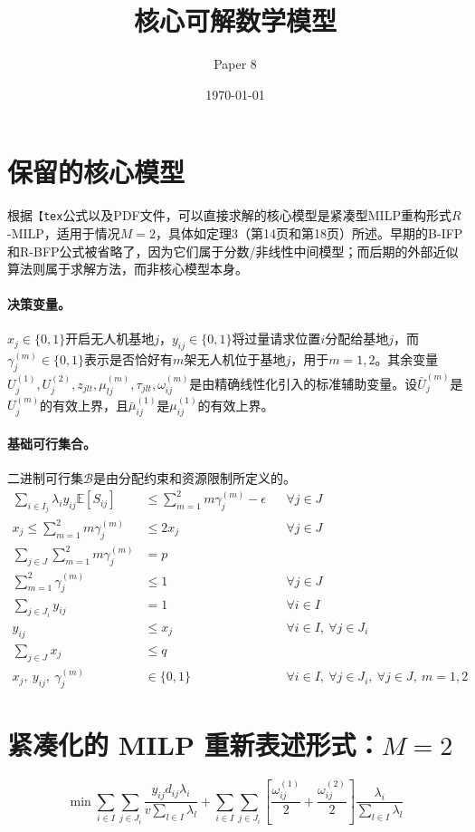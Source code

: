 \documentclass{article}
\title{核心可解数学模型}
\author{Paper 8}
\date{\today}
\begin{document}
\maketitle

\section*{保留的核心模型}
根据\texttt{【tex}公式以及PDF文件，可以直接求解的核心模型是紧凑型MILP重构形式$R$-MILP，适用于情况$M=2$，具体如定理3（第14页和第18页）所述。早期的B-IFP和R-BFP公式被省略了，因为它们属于分数/非线性中间模型；而后期的外部近似算法则属于求解方法，而非核心模型本身。

\paragraph{决策变量。}
$x_j \in \{0,1\}$开启无人机基地$j$，$y_{ij}\in\{0,1\}$将过量请求位置$i$分配给基地$j$，而$\gamma_j^{(m)}\in\{0,1\}$表示是否恰好有$m$架无人机位于基地$j$，用于$m=1,2$。其余变量$U_j^{(1)},U_j^{(2)},z_{jlt},\mu_{lj}^{(m)},\tau_{jlt},\omega_{ij}^{(m)}$是由精确线性化引入的标准辅助变量。设$\bar U_j^{(m)}$是$U_j^{(m)}$的有效上界，且$\bar\mu_{ij}^{(1)}$是$\mu_{ij}^{(1)}$的有效上界。

\paragraph{基础可行集合。}
二进制可行集$\mathcal B$是由分配约束和资源限制所定义的。
\begin{align}
\sum_{i \in I_j} \lambda_i y_{ij}\mathbb{E}[S_{ij}] &\le \sum_{m=1}^{2} m\gamma_j^{(m)} - \epsilon
&& \forall j \in J \tag{9b}\\
x_j \le \sum_{m=1}^{2} m\gamma_j^{(m)} &\le 2x_j
&& \forall j \in J \tag{9c}\\
\sum_{j \in J} \sum_{m=1}^{2} m\gamma_j^{(m)} &= p \tag{9d}\\
\sum_{m=1}^{2} \gamma_j^{(m)} &\le 1
&& \forall j \in J \tag{9e}\\
\sum_{j \in J_i} y_{ij} &= 1
&& \forall i \in I \tag{8c}\\
y_{ij} &\le x_j
&& \forall i \in I,\ \forall j \in J_i \tag{8d}\\
\sum_{j \in J} x_j &\le q \tag{8e}\\
x_j,\ y_{ij},\ \gamma_j^{(m)} &\in \{0,1\}
&& \forall i \in I,\ \forall j \in J_i,\ \forall j \in J,\ m=1,2 \tag{8h/9f}
\end{align}

\section*{紧凑化的 MILP 重新表述形式：$M=2$}
\begin{equation}
\min
\sum_{i \in I} \sum_{j \in J_i} \frac{y_{ij} d_{ij} \lambda_i}{v \sum_{l \in I} \lambda_l}
+
\sum_{i \in I} \sum_{j \in J_i}
\left[
\frac{\omega_{ij}^{(1)}}{2} + \frac{\omega_{ij}^{(2)}}{2}
\right]
\frac{\lambda_i}{\sum_{l \in I} \lambda_l}
\tag{13a}
\end{equation}
\end{document}
